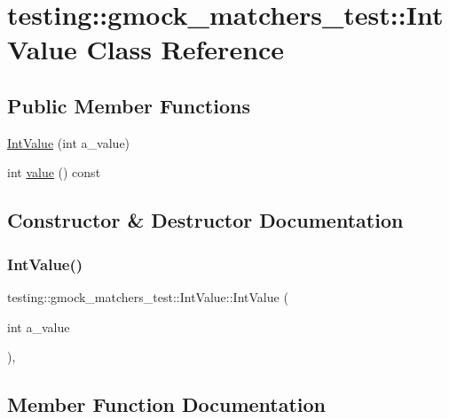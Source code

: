 \hypertarget{classtesting_1_1gmock__matchers__test_1_1IntValue}{}\section{testing\+::gmock\+\_\+matchers\+\_\+test\+::Int\+Value Class Reference}
\label{classtesting_1_1gmock__matchers__test_1_1IntValue}
\subsection*{Public Member Functions}
\begin{DoxyCompactItemize}
\item 
\mbox{\hyperlink{classtesting_1_1gmock__matchers__test_1_1IntValue_a2a294fcf7ad9f4d9888c4e6194fcd848}{Int\+Value}} (int a\+\_\+value)
\item 
int \mbox{\hyperlink{classtesting_1_1gmock__matchers__test_1_1IntValue_a6da000ea8ff787591e07ffaa3c1027d4}{value}} () const
\end{DoxyCompactItemize}


\subsection{Constructor \& Destructor Documentation}
\mbox{\label{classtesting_1_1gmock__matchers__test_1_1IntValue_a2a294fcf7ad9f4d9888c4e6194fcd848}} 
\subsubsection{\texorpdfstring{IntValue()}{IntValue()}}
{\footnotesize\ttfamily testing\+::gmock\+\_\+matchers\+\_\+test\+::\+Int\+Value\+::\+Int\+Value (\begin{DoxyParamCaption}\item[{int}]{a\+\_\+value }\end{DoxyParamCaption})\hspace{0.3cm}{\ttfamily [inline]}, {\ttfamily [explicit]}}



\subsection{Member Function Documentation}
\mbox{\label{classtesting_1_1gmock__matchers__test_1_1IntValue_a6da000ea8ff787591e07ffaa3c1027d4}} 
